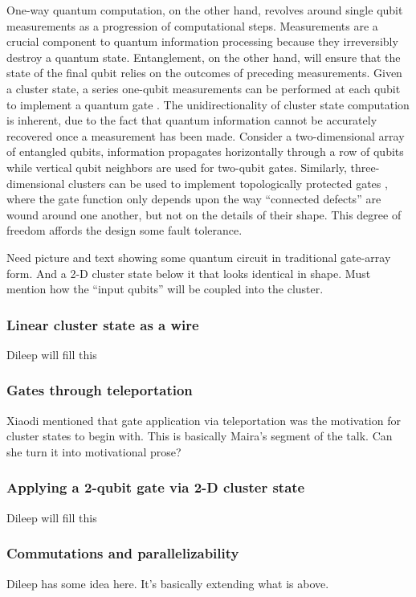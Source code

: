 \documentclass[twocolumn]{Styles/IEEEtran11}
\newcommand{\clb}{\color{blue}}
\newcommand{\clr}{\color{myRed}}
\newcommand{\clbl}{\color{black}}
\begin{document}
One-way quantum computation, on the other hand, revolves around single qubit measurements as a progression of computational steps. Measurements are a crucial component to quantum information processing because they irreversibly destroy a quantum state. Entanglement, on the other hand, will ensure that the state of the final qubit relies on the outcomes of preceding measurements. Given a cluster state, a series one-qubit measurements can be performed at each qubit to implement a quantum gate \cite{jorrand2005unifying}.  The unidirectionality of cluster state computation is inherent, due to the fact that quantum information cannot be accurately recovered once a measurement has been made. Consider a two-dimensional array of entangled qubits, information propagates horizontally through a row of qubits while vertical qubit neighbors are used for two-qubit gates. Similarly, three-dimensional clusters can be used to implement topologically protected gates \cite{raussendorf2007topological}, where the gate function only depends upon the way ``connected defects'' are wound around one another, but not on the details of their shape. This degree of freedom affords the design some fault tolerance.

\clr
Need picture and text showing some quantum circuit in traditional gate-array form. And a 2-D cluster state below it that looks identical in shape. Must mention how the ``input qubits'' will be coupled into the cluster.
\clb
\subsubsection{Linear cluster state as a wire}
\clr Dileep will fill this
\clb 
\subsubsection{Gates through teleportation}
\clr Xiaodi mentioned that gate application via teleportation was the motivation for cluster states to begin with. This is basically Maira's segment of the talk. Can she turn it into motivational prose?

\clb
\subsubsection{Applying a 2-qubit gate via 2-D cluster state}
\clr Dileep will fill this
\clb 
\subsubsection{Commutations and parallelizability}
\clr Dileep has some idea here. It's basically extending what is above.
\clbl
\end{document}
